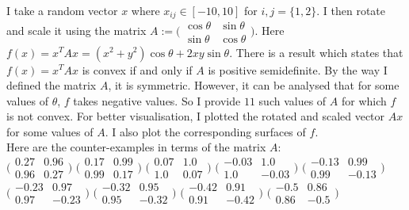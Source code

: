 \documentclass{article}
\begin{document}
\begin{flushleft}
I take a random vector $x$ where $x_{ij}\in[-10,10]$ for $i,j=\{1,2\}$. I then rotate and scale it using the matrix $A:=\Big(\begin{matrix}\cos\theta & \sin\theta \\ \sin\theta & \cos\theta\end{matrix}\Big)$. Here $f(x)=x^{T}Ax=(x^{2}+y^{2})\cos\theta+2xy\sin\theta$. There is a result which states that $f(x)=x^{T}Ax$ is convex if and only if $A$ is positive semidefinite. By the way I defined the matrix $A$, it is symmetric. However, it can be analysed that for some values of $\theta$, $f$ takes negative values. So I provide $11$ such values of $A$ for which $f$ is not convex. For better visualisation, I plotted the rotated and scaled vector $Ax$ for some values of $A$. I also plot the corresponding surfaces of $f$.\\
Here are the counter-examples in terms of the matrix $A$:\\
$\Big(\begin{matrix}0.27 & 0.96 \\ 0.96 & 0.27\end{matrix}\Big)$
$\Big(\begin{matrix}0.17 & 0.99 \\ 0.99 & 0.17\end{matrix}\Big)$
$\Big(\begin{matrix}0.07 & 1.0 \\ 1.0 & 0.07\end{matrix}\Big)$
$\Big(\begin{matrix}-0.03 & 1.0 \\ 1.0 & -0.03\end{matrix}\Big)$
$\Big(\begin{matrix}-0.13 & 0.99 \\ 0.99 & -0.13\end{matrix}\Big)$
$\Big(\begin{matrix}-0.23 & 0.97 \\ 0.97 & -0.23\end{matrix}\Big)$
$\Big(\begin{matrix}-0.32 & 0.95 \\ 0.95 & -0.32\end{matrix}\Big)$
$\Big(\begin{matrix}-0.42 & 0.91 \\ 0.91 & -0.42\end{matrix}\Big)$
$\Big(\begin{matrix}-0.5 & 0.86 \\ 0.86 & -0.5\end{matrix}\Big)$

\end{flushleft}
\end{document}
